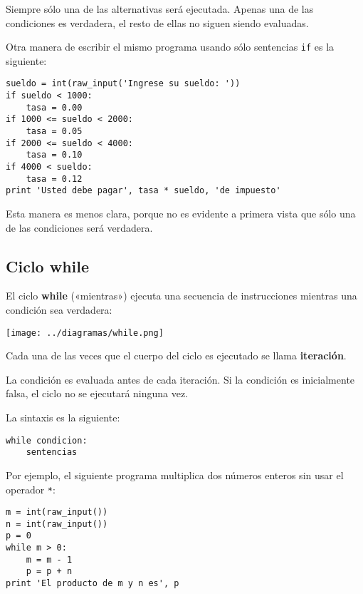 Siempre sólo una de las alternativas será ejecutada. Apenas una de las
condiciones es verdadera, el resto de ellas no siguen siendo evaluadas.

Otra manera de escribir el mismo programa usando sólo sentencias
\lstinline!if! es la siguiente:

\begin{lstlisting}
sueldo = int(raw_input('Ingrese su sueldo: '))
if sueldo < 1000:
    tasa = 0.00
if 1000 <= sueldo < 2000:
    tasa = 0.05
if 2000 <= sueldo < 4000:
    tasa = 0.10
if 4000 < sueldo:
    tasa = 0.12
print 'Usted debe pagar', tasa * sueldo, 'de impuesto'
\end{lstlisting}

Esta manera es menos clara, porque no es evidente a primera vista que
sólo una de las condiciones será verdadera.

\subsection{Ciclo while}

El ciclo \textbf{while} («mientras») ejecuta una secuencia de
instrucciones mientras una condición sea verdadera:

\texttt{[image: ../diagramas/while.png]}

Cada una de las veces que el cuerpo del ciclo es ejecutado se llama
\textbf{iteración}.

La condición es evaluada antes de cada iteración. Si la condición es
inicialmente falsa, el ciclo no se ejecutará ninguna vez.

La sintaxis es la siguiente:

\begin{lstlisting}
while condicion:
    sentencias
\end{lstlisting}

Por ejemplo, el siguiente programa multiplica dos números enteros sin
usar el operador \lstinline!*!:

\begin{lstlisting}
m = int(raw_input())
n = int(raw_input())
p = 0
while m > 0:
    m = m - 1
    p = p + n
print 'El producto de m y n es', p
\end{lstlisting}

